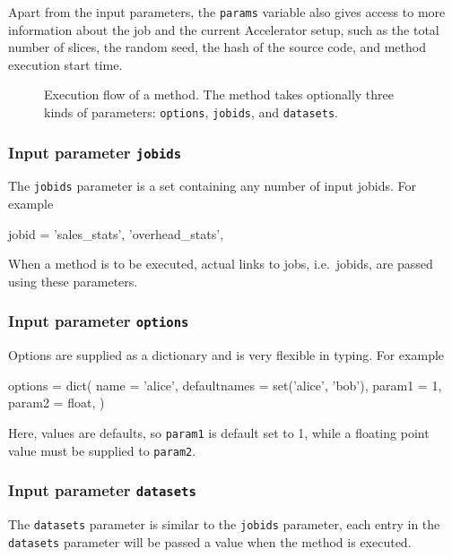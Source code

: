 Apart from the input parameters, the \texttt{params} variable also
gives access to more information about the job and the current
Accelerator setup, such as the total number of slices, the random
seed, the hash of the source code, and method execution start time.


\begin{figure}[h!]
  \begin{center}
    
    \caption{Execution flow of a method.  The method takes optionally
      three kinds of parameters: \texttt{options}, \texttt{jobids},
      and \texttt{datasets}.}
    \label{fig:execflow}
  \end{center}
\end{figure}


\subsubsection*{Input parameter \texttt{jobids}}
The \texttt{jobids} parameter is a set containing any number of input
jobids.  For example
\begin{python}
jobid = {'sales_stats', 'overhead_stats',}
\end{python}
When a method is to be executed, actual links to jobs, i.e.\ jobids,
are passed using these parameters.


\subsubsection*{Input parameter \texttt{options}}
Options are supplied as a dictionary and is very flexible in typing.  For example
\begin{python}
options = dict(
    name = 'alice',
    defaultnames = set('alice', 'bob'),
    param1 = 1,
    param2 = float,
)
\end{python}
Here, values are defaults, so \texttt{param1} is default set to 1,
while a floating point value must be supplied to \texttt{param2}.

\subsubsection*{Input parameter \texttt{datasets}}
The \texttt{datasets} parameter is similar to the \texttt{jobids}
parameter, each entry in the \texttt{datasets} parameter will be
passed a value when the method is executed.





